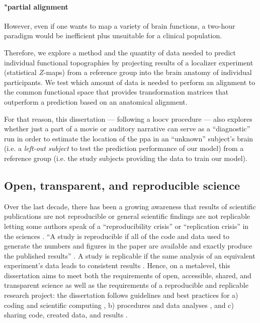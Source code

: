 \paragraph{"partial alignment}

%
However, even if one wants to map a variety of brain functions, a two-hour
paradigm would be inefficient plus unsuitable for a clinical population.

%
Therefore, we explore a method and the quantity of data needed
to predict individual functional topographies by projecting results of a
localizer experiment (statistical $Z$-maps) from a reference group into the
brain anatomy of individual participants.
%
We test which amount of data is needed to perform an alignment
to the common functional space that provides transformation matrices that
outperform a prediction based on an anatomical alignment.

%
For that reason, this dissertation --- following a \ac{loocv} procedure --- also
explores whether just a part of a movie or auditory narrative can serve as a
``diagnostic'' run in order to estimate the location of the \ac{ppa} in an
``unknown'' subject's brain (i.e. a \textit{left-out subject} to test the
prediction performance of our model) from a reference group (i.e. the study
subjects providing the data to train our model).


\subsection{Open, transparent, and reproducible science}

Over the last decade, there has been a growing awareness that results of
scientific publications are not reproducible or general scientific findings are
not replicable letting some authors speak of a ``reproducibility crisis'' or
``replication crisis'' in the sciences \citep{baker2016reproducibility,
plesser2018reproducibility, stupple2019reproducibility, nosek2022replicability}.
``A study is reproducible if all of the code and data used to generate the
numbers and figures in the paper are available and exactly produce the published
results'' \citep{leek2017most}.
A study is replicable if the same analysis of an equivalent experiment's data
leads to consistent results \citep{dubois2016building, leek2017most}.
%
Hence, on a metalevel, this dissertation aims to meet both the requirements of
open, accessible, shared, and transparent science \citep{watson2015will,
fecher2014open} as well as the requirements of a reproducible and replicable
research project:
%
the dissertation follows guidelines and best practices for a) coding and
scientific computing \citep{wilson2014best}, b) procedures and data analyses
\citep{nichols2017best, poldrack2017scanning, poldrack2019establishment}, and c)
sharing code, created data, and results \citep{eglen2017toward, nichols2017best,
pernet2015improving}.


